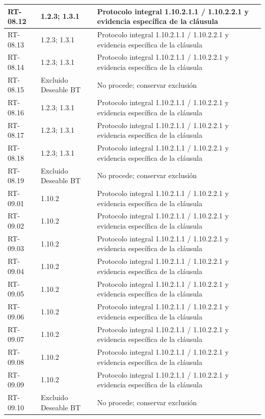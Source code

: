 \begin{longtable}{L{23mm}L{46mm}L{72mm}}
RT-08.12 & 1.2.3; 1.3.1 & Protocolo integral 1.10.2.1.1 / 1.10.2.2.1 y evidencia específica de la cláusula\\\hline
RT-08.13 & 1.2.3; 1.3.1 & Protocolo integral 1.10.2.1.1 / 1.10.2.2.1 y evidencia específica de la cláusula\\\hline
RT-08.14 & 1.2.3; 1.3.1 & Protocolo integral 1.10.2.1.1 / 1.10.2.2.1 y evidencia específica de la cláusula\\\hline
RT-08.15 & Excluido Deseable BT & No procede; conservar exclusión\\\hline
RT-08.16 & 1.2.3; 1.3.1 & Protocolo integral 1.10.2.1.1 / 1.10.2.2.1 y evidencia específica de la cláusula\\\hline
RT-08.17 & 1.2.3; 1.3.1 & Protocolo integral 1.10.2.1.1 / 1.10.2.2.1 y evidencia específica de la cláusula\\\hline
RT-08.18 & 1.2.3; 1.3.1 & Protocolo integral 1.10.2.1.1 / 1.10.2.2.1 y evidencia específica de la cláusula\\\hline
RT-08.19 & Excluido Deseable BT & No procede; conservar exclusión\\\hline
RT-09.01 & 1.10.2 & Protocolo integral 1.10.2.1.1 / 1.10.2.2.1 y evidencia específica de la cláusula\\\hline
RT-09.02 & 1.10.2 & Protocolo integral 1.10.2.1.1 / 1.10.2.2.1 y evidencia específica de la cláusula\\\hline
RT-09.03 & 1.10.2 & Protocolo integral 1.10.2.1.1 / 1.10.2.2.1 y evidencia específica de la cláusula\\\hline
RT-09.04 & 1.10.2 & Protocolo integral 1.10.2.1.1 / 1.10.2.2.1 y evidencia específica de la cláusula\\\hline
RT-09.05 & 1.10.2 & Protocolo integral 1.10.2.1.1 / 1.10.2.2.1 y evidencia específica de la cláusula\\\hline
RT-09.06 & 1.10.2 & Protocolo integral 1.10.2.1.1 / 1.10.2.2.1 y evidencia específica de la cláusula\\\hline
RT-09.07 & 1.10.2 & Protocolo integral 1.10.2.1.1 / 1.10.2.2.1 y evidencia específica de la cláusula\\\hline
RT-09.08 & 1.10.2 & Protocolo integral 1.10.2.1.1 / 1.10.2.2.1 y evidencia específica de la cláusula\\\hline
RT-09.09 & 1.10.2 & Protocolo integral 1.10.2.1.1 / 1.10.2.2.1 y evidencia específica de la cláusula\\\hline
RT-09.10 & Excluido Deseable BT & No procede; conservar exclusión\\\hline

\end{longtable}
